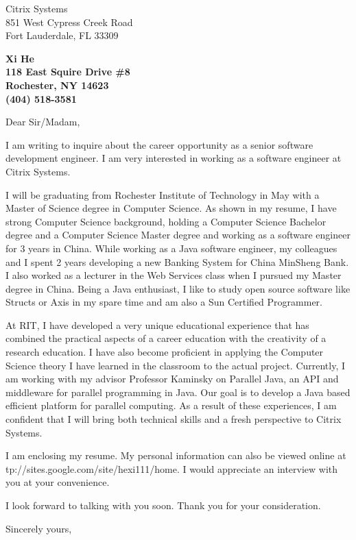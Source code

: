 \documentclass[10pt]{letter} %
\makeatletter
\newcommand*\wrapletters[1]{\wr@pletters#1\@nil}
\newcommand{\company}{Citrix Systems}
\newcommand{\addr}{851 West Cypress Creek Road\\Fort Lauderdale, FL 33309}
\newcommand{\position}{senior software development engineer}
\newcommand{\technique}{software engineer }
\def\wr@pletters#1#2\@nil{#1\allowbreak\if&#2&\else\wr@pletters#2\@nil\fi}
\makeatother
\begin{document}
\signature{Xi He}                  %
\longindentation=0pt                       %
\let\raggedleft\raggedright                %
 
\begin{letter}{\company \\ \addr}

\begin{center}
\large\bf Xi He\\
118 East Squire Drive \#8\\ Rochester, NY 14623 \\ (404) 518-3581
\end{center} 
\vfill %


 
\opening{Dear Sir/Madam,} 
 
\noindent I am writing to inquire about the career opportunity as a \position.
I am very interested in working as a \technique at \company. 
 
\noindent I will be graduating from Rochester Institute of Technology in May with a Master of Science degree in Computer Science. As shown in my resume, I have strong Computer Science background, holding a Computer Science Bachelor degree and a Computer Science Master degree and working as a software engineer for 3 years in China. While working as a Java software engineer, my colleagues and I spent 2 years developing a new Banking System for China MinSheng Bank.  I also worked as a lecturer in the Web Services class when I pursued my Master degree in China. Being a Java enthusiast, I like to study open source software like Structs or Axis in my spare time and am also a Sun Certified Programmer. 

At RIT, I have developed a very unique educational experience that has combined the practical aspects of a career education with the creativity of a research education. I have also become proficient in applying the Computer Science theory I have learned in the classroom to the actual project. Currently, I am working with my advisor Professor Kaminsky on Parallel Java, an API and middleware for parallel programming in Java. Our goal is to develop a Java based efficient platform for parallel computing. As a result of these experiences, I am confident that I will bring both technical skills and a fresh perspective to \company.
 
\noindent I am enclosing my resume. My personal information can also be viewed online at \wrapletters{http://sites.google.com/site/hexi111/home}.
I would appreciate an interview with you at your convenience. 

I look forward to talking with you soon. Thank you for your consideration.
 
\closing{Sincerely yours,}
 
 
\encl{}  				%

\end{letter}
 
\end{document}
